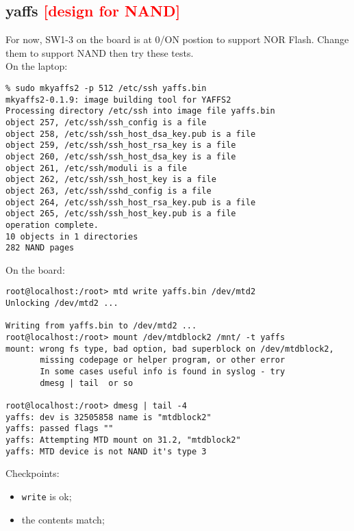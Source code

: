 \documentclass[a4paper]{report}
\begin{document}
\subsection{yaffs \textcolor{red}{[design for NAND]}}
For now, SW1-3 on the board is at 0/ON postion to support NOR Flash. Change them
to support NAND then try these tests.\\
On the laptop:
\begin{lstlisting}
% sudo mkyaffs2 -p 512 /etc/ssh yaffs.bin
mkyaffs2-0.1.9: image building tool for YAFFS2
Processing directory /etc/ssh into image file yaffs.bin
object 257, /etc/ssh/ssh_config is a file
object 258, /etc/ssh/ssh_host_dsa_key.pub is a file
object 259, /etc/ssh/ssh_host_rsa_key is a file
object 260, /etc/ssh/ssh_host_dsa_key is a file
object 261, /etc/ssh/moduli is a file
object 262, /etc/ssh/ssh_host_key is a file
object 263, /etc/ssh/sshd_config is a file
object 264, /etc/ssh/ssh_host_rsa_key.pub is a file
object 265, /etc/ssh/ssh_host_key.pub is a file
operation complete.
10 objects in 1 directories
282 NAND pages
\end{lstlisting}
On the board:
\begin{lstlisting}
root@localhost:/root> mtd write yaffs.bin /dev/mtd2
Unlocking /dev/mtd2 ...

Writing from yaffs.bin to /dev/mtd2 ...     
root@localhost:/root> mount /dev/mtdblock2 /mnt/ -t yaffs
mount: wrong fs type, bad option, bad superblock on /dev/mtdblock2,
       missing codepage or helper program, or other error
       In some cases useful info is found in syslog - try
       dmesg | tail  or so

root@localhost:/root> dmesg | tail -4
yaffs: dev is 32505858 name is "mtdblock2"
yaffs: passed flags ""
yaffs: Attempting MTD mount on 31.2, "mtdblock2"
yaffs: MTD device is not NAND it's type 3
\end{lstlisting}
Checkpoints:
\begin{itemize}
    \item {\tt write} is ok;
    \item the contents match;
\end{itemize}
\end{document}
